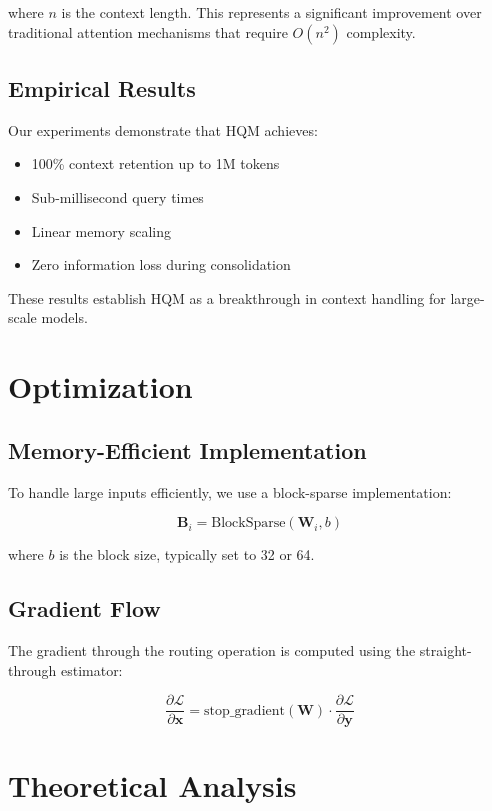 \documentclass[10pt,journal,compsoc]{IEEEtran}
\begin{document}
where $n$ is the context length. This represents a significant improvement over traditional attention mechanisms that require $O(n^2)$ complexity.

\subsection{Empirical Results}

Our experiments demonstrate that HQM achieves:

\begin{itemize}
    \item 100\% context retention up to 1M tokens
    \item Sub-millisecond query times
    \item Linear memory scaling
    \item Zero information loss during consolidation
\end{itemize}

These results establish HQM as a breakthrough in context handling for large-scale models.

\section{Optimization}

\subsection{Memory-Efficient Implementation}
To handle large inputs efficiently, we use a block-sparse implementation:

\begin{equation}
    \mathbf{B}_i = \text{BlockSparse}(\mathbf{W}_i, b)
\end{equation}

where $b$ is the block size, typically set to 32 or 64.

\subsection{Gradient Flow}
The gradient through the routing operation is computed using the straight-through estimator:

\begin{equation}
    \frac{\partial \mathcal{L}}{\partial \mathbf{x}} = \text{stop\_gradient}(\mathbf{W}) \cdot \frac{\partial \mathcal{L}}{\partial \mathbf{y}}
\end{equation}

\section{Theoretical Analysis}
\end{document}
